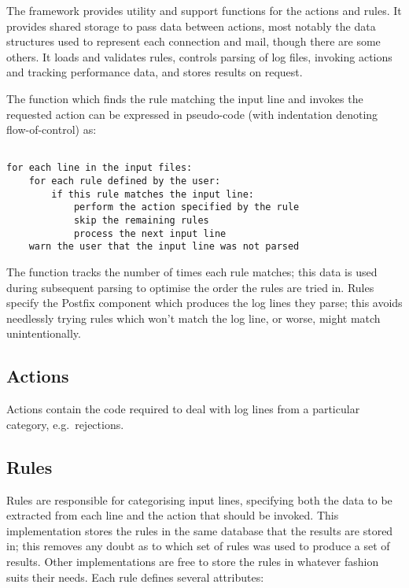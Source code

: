 \documentclass[]{svmult}
\begin{document}
The framework provides utility and support functions for the actions and
rules.  It provides shared storage to pass data between actions, most
notably the data structures used to represent each connection and mail,
though there are some others.  It loads and validates rules, controls
parsing of log files, invoking actions and tracking performance data, and
stores results on request.

The function which finds the rule matching the input line and invokes the
requested action can be expressed in pseudo-code (with indentation denoting
flow-of-control) as:

\begin{verbatim}

for each line in the input files:
    for each rule defined by the user:
        if this rule matches the input line:
            perform the action specified by the rule
            skip the remaining rules
            process the next input line
    warn the user that the input line was not parsed

\end{verbatim}

The function tracks the number of times each rule matches; this data is
used during subsequent parsing to optimise the order the rules are tried
in.  Rules specify the Postfix component which produces the log lines they
parse; this avoids needlessly trying rules which won't match the log line,
or worse, might match unintentionally.

\subsection{Actions}

\label{Actions}

Actions contain the code required to deal with log lines from a particular
category, e.g.\ rejections.  


\subsection{Rules}

\label{Rules}

Rules are responsible for categorising input lines, specifying both the
data to be extracted from each line and the action that should be invoked.
This implementation stores the rules in the same \SQL{} database that the
results are stored in; this removes any doubt as to which set of rules was
used to produce a set of results.  Other implementations are free to store
the rules in whatever fashion suits their needs.  Each rule defines several
attributes:
\end{document}
